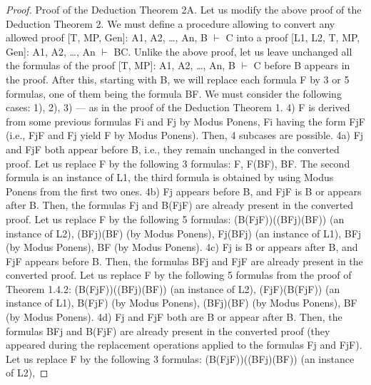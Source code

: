 \begin{proof}
Proof of the Deduction Theorem 2A. Let us modify the above proof of the Deduction Theorem 2.
We must define a procedure allowing to convert any allowed proof [T, MP, Gen]: A1, A2, \ldots , An, B \(\vdash\) C
into a proof [L1, L2, T, MP, Gen]: A1, A2, \ldots , An \(\vdash\) B\IMPLIES C.
Unlike the above proof, let us leave unchanged all the formulas of the proof [T, MP]: A1, A2, \ldots , An, B \(\vdash\)
C before B appears in the proof. After this, starting with B, we will replace each formula F by 3 or 5
formulas, one of them being the formula B\IMPLIES F.
We must consider the following cases:
1), 2), 3) --- as in the proof of the Deduction Theorem 1.
4) F is derived from some previous formulas Fi and Fj by Modus Ponens, Fi having the form Fj\IMPLIES F (i.e.,
Fj\IMPLIES F and Fj yield F by Modus Ponens). Then, 4 subcases are possible.
4a) Fj and Fj\IMPLIES F both appear before B, i.e., they remain unchanged in the converted proof. Let us replace
F by the following 3 formulas: F, F\IMPLIES (B\IMPLIES F), B\IMPLIES F. The second formula is an instance of L1, the third
formula is obtained by using Modus Ponens from the first two ones.
4b) Fj appears before B, and Fj\IMPLIES F is B or appears after B. Then, the formulas Fj and B\IMPLIES (Fj\IMPLIES F) are
already present in the converted proof. Let us replace F by the following 5 formulas:
(B\IMPLIES (Fj\IMPLIES F))\IMPLIES ((B\IMPLIES Fj)\IMPLIES (B\IMPLIES F)) (an instance of L2),
(B\IMPLIES Fj)\IMPLIES (B\IMPLIES F) (by Modus Ponens),
Fj\IMPLIES (B\IMPLIES Fj) (an instance of L1),
B\IMPLIES Fj (by Modus Ponens),
B\IMPLIES F (by Modus Ponens).
4c) Fj is B or appears after B, and Fj\IMPLIES F appears before B. Then, the formulas B\IMPLIES Fj and Fj\IMPLIES F are
already present in the converted proof. Let us replace F by the following 5 formulas from the proof of
Theorem 1.4.2:
(B\IMPLIES (Fj\IMPLIES F))\IMPLIES ((B\IMPLIES Fj)\IMPLIES (B\IMPLIES F)) (an instance of L2),
(Fj\IMPLIES F)\IMPLIES (B\IMPLIES (Fj\IMPLIES F)) (an instance of L1),
B\IMPLIES (Fj\IMPLIES F) (by Modus Ponens),
(B\IMPLIES Fj)\IMPLIES (B\IMPLIES F) (by Modus Ponens),
B\IMPLIES F (by Modus Ponens).
4d) Fj and Fj\IMPLIES F both are B or appear after B. Then, the formulas B\IMPLIES Fj and B\IMPLIES (Fj\IMPLIES F) are already
present in the converted proof (they appeared during the replacement operations applied to the formulas
Fj and Fj\IMPLIES F). Let us replace F by the following 3 formulas:
(B\IMPLIES (Fj\IMPLIES F))\IMPLIES ((B\IMPLIES Fj)\IMPLIES (B\IMPLIES F)) (an instance of L2),

\end{proof}
